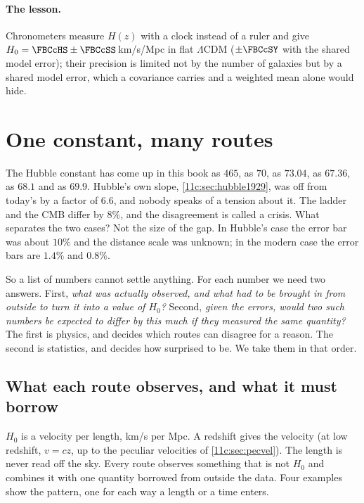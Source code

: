 \paragraph{The lesson.} Chronometers measure $H(z)$ with a clock instead of a ruler and
give $H_0=\FBCcHS\pm\FBCcSS$\,km/s/Mpc in flat $\Lambda$CDM ($\pm\FBCcSY$ with the shared
model error); their precision is limited not by the number of galaxies but by a shared
model error, which a covariance carries and a weighted mean alone would hide.
\section{One constant, many routes}
\label{11c:sec:h0-routes}

The Hubble constant has come up in this book as $465$, as $70$, as $73.04$, as $67.36$, as
$68.1$ and as $69.9$. Hubble's own slope, \cref{11c:sec:hubble1929}, was off from
today's by a factor of $6.6$, and nobody speaks of a tension about it. The ladder and the
CMB differ by $8\%$, and the disagreement is called a crisis. What separates the two
cases? Not the size of the gap. In Hubble's case the error bar was about $10\%$ and the distance scale was
unknown; in the modern case the error bars are $1.4\%$ and $0.8\%$.

So a list of numbers cannot settle anything. For each number we need two answers. First,
\emph{what was actually observed, and what had to be brought in from outside to turn it
into a value of $H_0$?} Second, \emph{given the errors, would two such numbers be expected to
differ by this much if they measured the same quantity?} The first is physics, and decides
which routes can disagree for a reason. The second is statistics, and decides how
surprised to be. We take them in that order.

\subsection{What each route observes, and what it must borrow}
\label{11c:sec:h0-borrow}

$H_0$ is a velocity per length, km/s per Mpc. A redshift gives the velocity (at low
redshift, $v=cz$, up to the peculiar velocities of \cref{11c:sec:pecvel}). The length is
never read off the sky. Every route observes something that is not $H_0$ and combines it
with one quantity borrowed from outside the data. Four examples show the pattern, one
for each way a length or a time enters.

